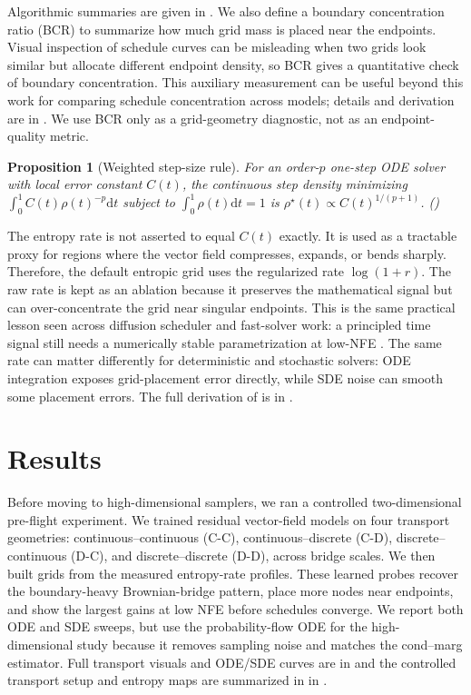 \documentclass{article}
\newcommand{\dd}{\mathrm{d}}
\newcommand{\inlineeqtag}[1]{\refstepcounter{equation}\label{#1}\nobreak\hfill\textup{(\theequation)}\par}
\theoremstyle{plain}
\newtheorem{proposition}{Proposition}
\theoremstyle{definition}
\theoremstyle{remark}
\begin{document}
Algorithmic summaries are given in . We also define a boundary concentration ratio (BCR) to summarize how much grid mass is placed near the endpoints. Visual inspection of schedule curves can be misleading when two grids look similar but allocate different endpoint density, so BCR gives a quantitative check of boundary concentration. This auxiliary measurement can be useful beyond this work for comparing schedule concentration across models; details and derivation are in . We use BCR only as a grid-geometry diagnostic, not as an endpoint-quality metric.

\begin{proposition}[Weighted step-size rule]
    \label{prop:ode_error}
    For an order-$p$ one-step ODE solver with local error constant $C(t)$, the continuous step density minimizing $\int_0^1 C(t)\rho(t)^{-p}\dd t$ subject to $\int_0^1\rho(t)\dd t=1$ is \(\displaystyle \rho^\star(t)\propto C(t)^{1/(p+1)}\). \inlineeqtag{eq:rho_star}
    \end{proposition}

The entropy rate is not asserted to equal $C(t)$ exactly. It is used as a tractable proxy for regions where the vector field compresses, expands, or bends sharply. Therefore, the default entropic grid uses the regularized rate $\log(1+r)$. The raw rate is kept as an ablation because it preserves the mathematical signal but can over-concentrate the grid near singular endpoints. This is the same practical lesson seen across diffusion scheduler and fast-solver work: a principled time signal still needs a numerically stable parametrization at low-NFE \citep{karras2022edm, lin2024common, chen2023importance, lu2022dpm, stancevic2025entropic}. The same rate can matter differently for deterministic and stochastic solvers: ODE integration exposes grid-placement error directly, while SDE noise can smooth some placement errors. The full derivation of  is in .

\section{Results}
\label{sec:evidence}

Before moving to high-dimensional samplers, we ran a controlled two-dimensional pre-flight experiment. We trained residual vector-field models on four transport geometries: continuous--continuous (C-C), continuous--discrete (C-D), discrete--continuous (D-C), and discrete--discrete (D-D), across bridge scales. We then built grids from the measured entropy-rate profiles. These learned probes recover the boundary-heavy Brownian-bridge pattern, place more nodes near endpoints, and show the largest gains at low NFE before schedules converge. We report both ODE and SDE sweeps, but use the probability-flow ODE for the high-dimensional study because it removes sampling noise and matches the cond--marg estimator. Full transport visuals and ODE/SDE curves are in  and the controlled transport setup and entropy maps are summarized in in  .
\end{document}
